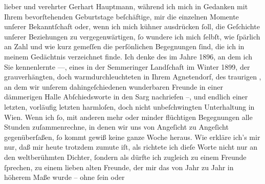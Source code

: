 \begin{ledgroupsized}[t]{13cm}
               lieber und verehrter Gerhart Hauptmann, während ich mich in Gedanken mit Ihrem
               bevorſtehenden Geburtstage beſchäftige, mir die einzelnen Momente unſerer
               Bekanntſchaft oder, wenn ich mich kühner ausdrücken ſoll, die Geſchichte unſerer
               Beziehungen zu vergegenwärtigen, ſo wundere ich mich ſelbſt, wie ſpärlich an Zahl und
               wie kurz gemeſſen die perſönlichen Begegnungen ſind, die ich in meinem Gedächtnis
               verzeichnet finde. Ich denke des \label{K_L02377-2v}\label{K_L02377-2h} im Jahre 1896, an dem ich Sie kennenlernte —, eines \label{K_L02377-3v}\label{K_L02377-3h} in der Semmeringer Landſchaft im
                  Winter 1899, der grauverhängten, doch warmdurchleuchteten \label{K_L02377-4v}\label{K_L02377-4h} in Ihrem Agnetendorf, des traurigen
                  \label{K_L02377-5v}\label{K_L02377-5h}, an dem wir unſerem dahingeſchiedenen wunderbaren Freunde in einer dämmerigen Halle
               Abſchiedsworte in den Sarg nachriefen –, und endlich einer letzten, vorläufig letzten
               harmloſen, doch nicht unbeſchwingten Unterhaltung in Wien. Wenn ich ſo, mit anderen mehr oder minder flüchtigen Begegnungen alle
               Stunden zuſammenrechne, in denen wir uns von Angeſicht zu Angeſicht gegenüberſaßen,
               ſo kommt gewiß keine ganze Woche heraus. Wie erkläre ich’s mir nur, daß mir heute
               trotzdem zumute iſt, als richtete ich dieſe Worte nicht nur an den weltberühmten
               Dichter, ſondern als dürfte ich zugleich zu einem Freunde ſprechen, zu einem lieben
               alten Freunde, der mir das von Jahr zu Jahr in höherem Maße wurde – ohne ſein oder

\end{ledgroupsized}
